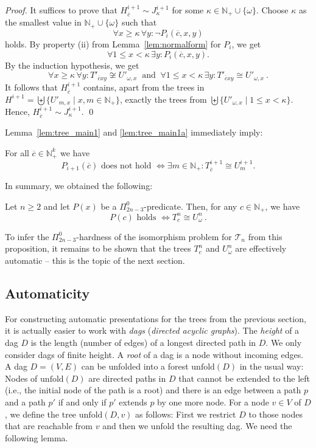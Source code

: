 \documentclass[envcountsame]{llncs}
\newcommand{\unfold}{\mathrm{unfold}}
\newcommand{\N}{\mathbb N}
\newcommand{\T}{\mathcal T}
\begin{document}
\begin{proof}
It suffices to prove that
$H^{i+1}_{\overline{c}} \sim J^{i+1}_\kappa$ for some
$\kappa \in \N_+\cup\{\omega\}$.
Choose $\kappa$ as the smallest value in $\N_+\cup\{\omega\}$
such that
$$
\forall x \geq \kappa\, \forall y : \neg P_i(\overline{c},x,y)
$$
holds. By property (ii) from
Lemma~\ref{lem:normalform} for $P_i$, we get
$$
\forall 1 \leq x < \kappa \, \exists y : P_i(\overline{c},x,y).
$$
By the induction hypothesis, we get
$$
\forall x \geq \kappa\, \forall y : T'_{\overline{c}xy}
\not\cong U'_{\omega,x}
\ \text{ and } \
\forall 1 \leq x < \kappa \, \exists y :  T'_{\overline{c}xy} \cong
U'_{\omega,x}\ .
$$
It follows that $H^{i+1}_{\overline{c}}$ contains, apart from the
trees in $H^{i+1} = \biguplus\{ U'_{m,x} \mid x,m\in \N_+\}$, exactly
the trees from $\biguplus\{ U'_{\omega,x} \mid 1 \leq x < \kappa \}$. Hence,
$H^{i+1}_{\overline{c}} \sim J^{i+1}_\kappa$.
\qed
\end{proof}
Lemma~\ref{lem:tree_main1} and \ref{lem:tree_main1a} immediately imply:

\begin{lemma}\label{lem:tree_main2}
  For all $\overline{c} \in \N_+^k$ we have
  \[
  P_{i+1}(\overline{c}) \text{ does not hold }
   \iff \exists m \in \N_+ : T^{i+1}_{\overline{c}}\cong U^{i+1}_m.
  \]
\end{lemma}
In summary, we obtained the following:

\begin{proposition}\label{P-for-hardness}
  Let $n\ge2$ and let $P(x)$ be a $\Pi^0_{2n-3}$-predicate. Then, for
  any $c\in\N_+$, we have
  \[
    P(c)\text{ holds }\iff T^n_{c}\cong U^n_\omega\ .
  \]
\end{proposition}
To infer the $\Pi^0_{2n-3}$-hardness of the isomorphism problem for
$\T_n$ from this proposition, it remains to be shown that the trees
$T^n_{c}$ and $U^n_\omega$ are effectively automatic -- this is the
topic of the next section.

\subsection{Automaticity}

For constructing automatic presentations for the trees
from the previous section, it is actually easier to work
with {\em dags} ({\em directed acyclic graphs}).
The {\em height} of a dag $D$ is the length (number of edges)
of a longest directed path in $D$. We only consider dags
of finite height. A {\em root} of a dag is a node without incoming edges. A dag $D = (V,E)$ can be unfolded into
a forest $\unfold(D)$ in the usual way:
Nodes of $\unfold(D)$ are directed paths in $D$
that cannot be extended to the left (i.e., the initial node
of the path is a root) and there is an edge
between a path $p$ and a path $p'$ if and only if $p'$ extends
$p$ by one more node. For a node $v \in V$ of $D$, we define
the tree $\unfold(D,v)$ as follows: First we restrict
$D$ to those nodes that are reachable from $v$ and then
we unfold the resulting dag.
We need the following lemma.
\end{document}
